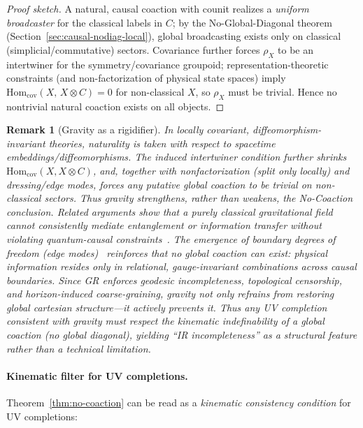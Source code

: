 \documentclass[11pt]{article}
\theoremstyle{upright}
\newtheorem{remark}{Remark}
\begin{document}
\begin{proof}[Proof sketch]
A natural, causal coaction with counit realizes a \emph{uniform broadcaster} for the classical labels in $C$; by the No-Global-Diagonal theorem (Section~\ref{sec:causal-nodiag-local}), global broadcasting exists only on classical (simplicial/commutative) sectors. Covariance further forces $\rho_X$ to be an intertwiner for the symmetry/covariance groupoid; representation-theoretic constraints (and non-factorization of physical state spaces) imply $\mathrm{Hom}_{\mathrm{cov}}(X,\,X\otimes C)=0$ for non-classical $X$, so $\rho_X$ must be trivial. Hence no nontrivial natural coaction exists on all objects.
\end{proof}

\begin{remark}[Gravity as a rigidifier]
In locally covariant, diffeomorphism-invariant theories, naturality is taken with respect to spacetime embeddings/diffeomorphisms. The induced intertwiner condition further shrinks $\mathrm{Hom}_{\mathrm{cov}}(X,X\otimes C)$, and, together with nonfactorization (split only locally) and dressing/edge modes, forces any putative global coaction to be trivial on non-classical sectors. Thus gravity strengthens, rather than weakens, the No-Coaction conclusion. Related arguments show that a purely classical gravitational field 
cannot consistently mediate entanglement or information transfer without violating quantum-causal constraints~\cite{Galley2022}. The emergence of boundary degrees of freedom (edge modes)~\cite{DonnellyWall2016} reinforces that no global coaction can exist: physical information resides only 
in relational, gauge-invariant combinations across causal boundaries. Since GR enforces geodesic incompleteness, topological censorship, and horizon-induced coarse-graining, gravity not only refrains from restoring global cartesian structure—it actively prevents it. Thus any UV completion consistent with gravity must respect the kinematic indefinability of a global coaction (no global diagonal), yielding “IR incompleteness” as a structural feature rather than a technical limitation.
\end{remark}

\paragraph{Kinematic filter for UV completions.}
Theorem~\ref{thm:no-coaction} can be read as a \emph{kinematic consistency condition} for UV completions:
\end{document}
